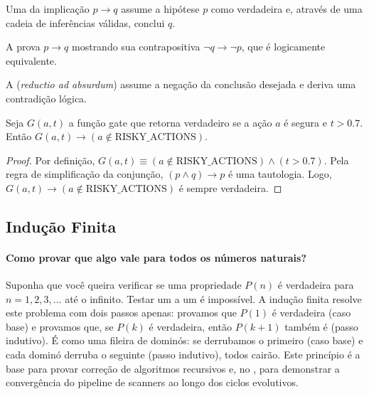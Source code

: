 \begin{definicao}
    Uma  da implicação $p \to q$ assume a
    hipótese $p$ como verdadeira e, através de uma cadeia de inferências
    válidas, conclui $q$.
\end{definicao}

\begin{definicao}
    A  prova $p \to q$ mostrando
    sua contrapositiva $\neg q \to \neg p$, que é logicamente equivalente.
\end{definicao}

\begin{definicao}
    A  (\textit{reductio ad absurdum})
    assume a negação da conclusão desejada e deriva uma contradição lógica.
\end{definicao}

\begin{teorema}
    Seja $G(a, t)$ a função gate que retorna verdadeiro se a ação $a$ é
    segura e $t > 0.7$. Então $G(a, t) \to (a \notin \text{RISKY\_ACTIONS})$.
\end{teorema}

\begin{proof}
    Por definição, $G(a, t) \equiv (a \notin \text{RISKY\_ACTIONS}) \land
    (t > 0.7)$. Pela regra de simplificação da conjunção,
    $(p \land q) \to p$ é uma tautologia. Logo, $G(a, t) \to
    (a \notin \text{RISKY\_ACTIONS})$ é sempre verdadeira.
\end{proof}

\subsection{Indução Finita}

\paragraph{Como provar que algo vale para todos os números naturais?}
Suponha que você queira verificar se uma propriedade $P(n)$ é verdadeira
para $n = 1, 2, 3, \ldots$ até o infinito. Testar um a um é impossível.
A indução finita resolve este problema com dois passos apenas: provamos que
$P(1)$ é verdadeira (caso base) e provamos que, se $P(k)$ é verdadeira,
então $P(k+1)$ também é (passo indutivo). É como uma fileira de dominós:
se derrubamos o primeiro (caso base) e cada dominó derruba o seguinte
(passo indutivo), todos cairão. Este princípio é a base para provar
correção de algoritmos recursivos e, no \opencodeeco{}, para demonstrar a
convergência do pipeline de scanners ao longo dos ciclos evolutivos.

